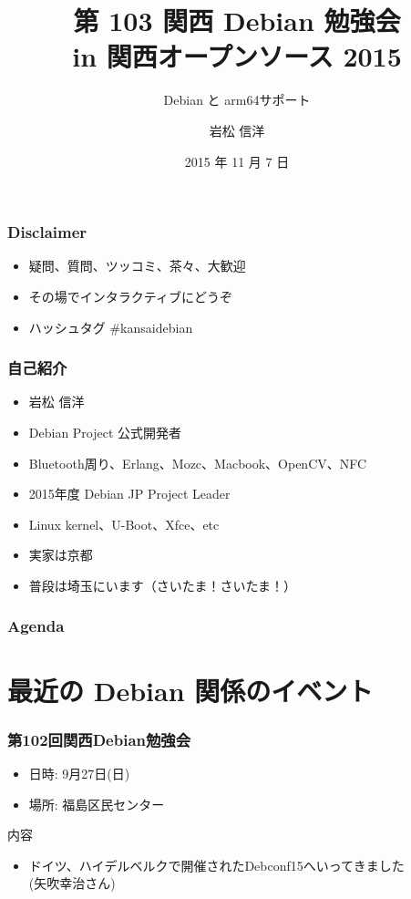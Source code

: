 \documentclass[cjk,dvipdfmx,10pt,compress,%
hyperref={bookmarks=true,bookmarksnumbered=true,bookmarksopen=false,%
colorlinks=false,%
pdftitle={第 103 回 関西 Debian 勉強会},%
pdfauthor={岩松 信洋},%
pdfsubject={資料},%
}]{beamer}
\title{第 103 関西 Debian 勉強会 \\in 関西オープンソース 2015}
\subtitle{Debian と arm64サポート}
\author[岩松 信洋]{{岩松 信洋}}
\institute[Debian JP]{{\normalsize\tt 関西 Debian 勉強会}}
\date{{\small 2015 年 11 月 7 日}}
\begin{document}
\settitleslide
\begin{frame}
\titlepage
\end{frame}
\setdefaultslide

\begin{frame}[fragile]
  \frametitle{Disclaimer}
  \begin{itemize}
  \item 疑問、質問、ツッコミ、茶々、\alert{大歓迎}
  \item その場でインタラクティブにどうぞ
  \item ハッシュタグ \#kansaidebian
  \end{itemize}
\end{frame}

\begin{frame}[fragile]
  \frametitle{自己紹介}
  \begin{itemize}
  \item 岩松 信洋
  \item Debian Project 公式開発者
  \item Bluetooth周り、Erlang、Mozc、Macbook、OpenCV、NFC
  \item 2015年度 Debian JP Project Leader
  \item Linux kernel、U-Boot、Xfce、etc
  \item 実家は京都
  \item 普段は埼玉にいます（さいたま！さいたま！）
  \end{itemize}
\end{frame}

\begin{frame}[fragile]
\frametitle{Agenda}

\tableofcontents

\end{frame}

\section{最近の Debian 関係のイベント}


\begin{frame}[fragile]
  \frametitle{第102回関西Debian勉強会}
  \begin{itemize}
  \item 日時: 9月27日(日)
  \item 場所: 福島区民センター
  \end{itemize}
  \begin{block}{内容}
    \begin{itemize}
    \item ドイツ、ハイデルベルクで開催されたDebconf15へいってきました \\
          (矢吹幸治さん)
    \end{itemize}
  \end{block}
\end{frame}
\end{document}
